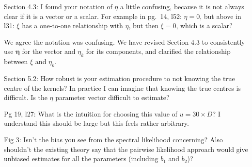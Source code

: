 \documentclass[12pt
]{article}
\begin{document}
\begin{Comments}
Section 4.3: I found your notation of $\eta$ a little confusing, because it is not always clear if it is a vector or a scalar. For example in pg.\ 14, l52: $\eta=0$, but above in l31: $\xi$ has a one-to-one relationship with $\eta$, but then $\xi=0$, which is a scalar?
\end{Comments}

\begin{Res}
We agree the notation was confusing. We have revised Section 4.3 to consistently use $\boldsymbol{\eta}$ for the vector and $\eta_k$ for its components, and clarified the relationship between $\xi$ and $\eta_k$.
\end{Res}

\begin{Comments}
Section 5.2: How robust is your estimation procedure to not knowing the true centre of the kernels? In practice I can imagine that knowing the true centres is difficult. Is the $\eta$ parameter vector difficult to estimate?
\end{Comments}

\begin{Res}
\end{Res}

\begin{Comments}
Pg 19, l27: What is the intuition for choosing this value of $u=30\times D$? I understand this should be large but this feels rather arbitrary.
\end{Comments}

\begin{Res}
\end{Res}

\begin{Comments}
Fig 3: Isn't the bias you see from the spectral likelihood concerning? Also shouldn't the existing theory say that the pairwise likelihood approach would give unbiased estimates for all the parameters (including $b_1$ and $b_2$)?
\end{Comments}

\begin{Res}
\end{Res}
\end{document}

